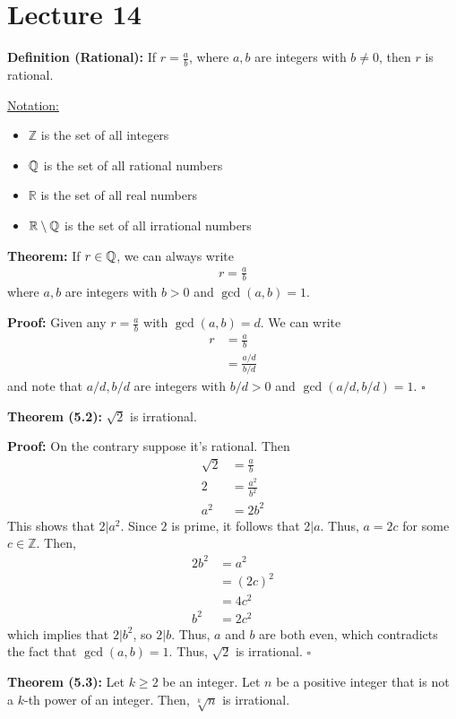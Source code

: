 \documentclass{article}
\newcommand*{\qed}{\hfill$\square$}%
\newcommand*{\rr}{\mathbb{R}}%
\newcommand*{\zz}{\mathbb{Z}}%
\begin{document}
\section{Lecture 14}

\textbf{Definition (Rational):} If $r=\frac{a}{b}$, where $a,b$ are integers with $b\neq 0$, then $r$ is rational.

\underline{Notation:} \begin{itemize}
    \item $\zz$ is the set of all integers
    \item $\mathbb{Q}$ is the set of all rational numbers
    \item $\rr$ is the set of all real numbers
    \item $\rr\setminus \qq$ is the set of all irrational numbers
\end{itemize}

\textbf{Theorem:} If $r\in \mathbb{Q}$, we can always write \begin{align*}
    r=\frac{a}{b}
\end{align*}where $a,b$ are integers with $b>0$ and $\gcd(a,b)=1$.

\textbf{Proof:} Given any $r=\frac{a}{b}$ with $\gcd(a,b)=d$. We can write \begin{align*}
    r&=\frac{a}{b} \\
     &= \frac{a/d}{b/d}
\end{align*}and note that $a/d, b/d$ are integers with $b/d>0$ and $\gcd(a/d,b/d)=1$. \qed

\textbf{Theorem (5.2):} $\sqrt{2}$ is irrational.

\textbf{Proof:} On the contrary suppose it's rational. Then \begin{align*}
    \sqrt{2}&=\frac{a}{b}\\
    2&=\frac{a^2}{b^2} \\
    a^2&=2b^2
\end{align*}This shows that $2|a^2$. Since $2$ is prime, it follows that $2|a$. Thus, $a=2c$ for some $c\in \zz$. Then, \begin{align*}
    2b^2&=a^2 \\
         &= (2c)^2 \\
         &= 4c^2 \\
    b^2&=2c^2
\end{align*}which implies that $2|b^2$, so $2|b$. Thus, $a$ and $b$ are both even, which contradicts the fact that $\gcd(a,b)=1$. Thus, $\sqrt{2}$ is irrational. \qed

\textbf{Theorem (5.3):} Let $k\geq 2$ be an integer. Let $n$ be a positive integer that is not a $k$-th power of an integer. Then, $\sqrt[k]{n}$ is irrational.
\end{document}
